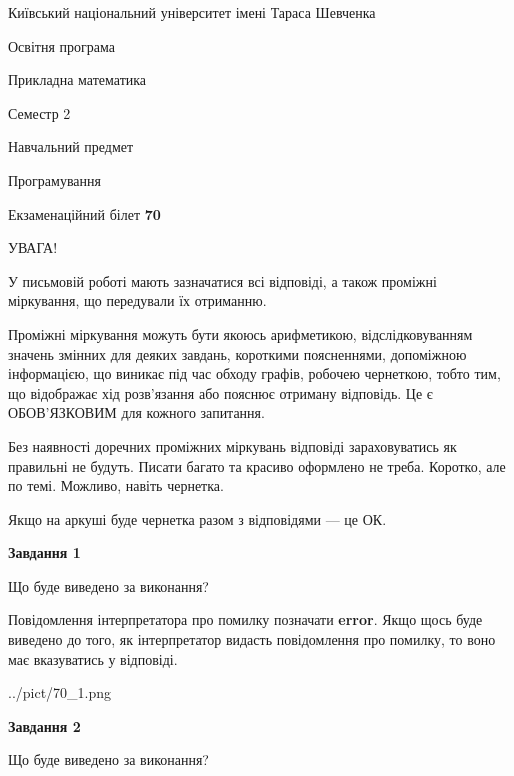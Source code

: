 \documentclass[12pt, ukrainian]{article}
\begin{document}
{{\begin {small}\par
{ \center  Київський національний університет імені Тараса Шевченка \par}
{\parbox {5 cm}{Освітня програма \hfill}{\parbox {7 cm}{Прикладна математика \hfill}}\parbox {6 cm}{\hfill Семестр 2}}\par
{\parbox {5 cm} {Навчальний предмет \hfill}\parbox {7 cm}{Програмування \hfill}\parbox {6cm}{\hfill}\par}\vspace{-7pt} \end{small}}{\center Екзаменаційний білет \No \textbf
{ 70 }\par}}
{
\begin {large}
УВАГА!

У письмовій роботі мають зазначатися всі відповіді, а також проміжні міркування, що передували їх отриманню.

Проміжні міркування можуть бути якоюсь арифметикою, відслідковуванням зна\-чень змінних для деяких завдань,
короткими поясненнями, допоміжною інформацією, що виникає під час обходу графів, робочею чернеткою,
тобто тим, що відображає хід розв’язання або пояснює отриману відповідь.
Це є ОБОВ’ЯЗКОВИМ для кожного запитання.

Без наявності доречних проміжних міркувань відповіді зараховуватись як правиль\-ні не будуть.
Писати багато та красиво оформлено не треба. Коротко, але по темі. Можли\-во, навіть чернетка.

Якщо на аркуші буде чернетка разом з відповідями --- це ОК.

\newpage

{\begin {center}\textbf{Завдання 1}\end {center}}\par
Що буде виведено за виконання?

Повідомлення інтерпретатора про помилку позначати \textbf{error}.
Якщо щось буде виведено до того, як інтерпретатор видасть повідомлення про помилку, 
то воно має вказуватись у відповіді. \par


\begin{center}
	{../pict/70_1.png}
\end{center}
\newpage

{\begin {center}\textbf{Завдання 2}\end {center}}\par
Що буде виведено за виконання?


\end{large}}
\end{document}

